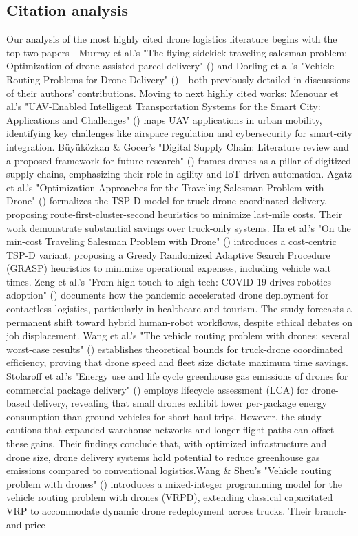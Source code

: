 \documentclass{article}
\begin{document}
\subsection{Citation analysis}
Our analysis of the most highly cited drone logistics literature begins with the top two papers—Murray et al.'s "The flying sidekick traveling salesman problem: Optimization of drone-assisted parcel delivery" (\cite{WOS:000353871700006}) and Dorling et al.'s "Vehicle Routing Problems for Drone Delivery" (\cite{WOS:000391480400007})—both previously detailed in discussions of their authors' contributions. Moving to next highly cited works: Menouar et al.'s "UAV-Enabled Intelligent Transportation Systems for the Smart City: Applications and Challenges" (\cite{WOS:000398037700003}) maps UAV applications in urban mobility, identifying key challenges like airspace regulation and cybersecurity for smart-city integration. Büyüközkan \& Gocer's "Digital Supply Chain: Literature review and a proposed framework for future research" (\cite{WOS:000432504700016}) frames drones as a pillar of digitized supply chains, emphasizing their role in agility and IoT-driven automation. Agatz et al.'s "Optimization Approaches for the Traveling Salesman Problem with Drone" (\cite{WOS:000442591800013}) formalizes the TSP-D model for truck-drone coordinated delivery, proposing route-first-cluster-second heuristics to minimize last-mile costs. Their work demonstrate substantial savings over truck-only systems. Ha et al.'s "On the min-cost Traveling Salesman Problem with Drone" (\cite{WOS:000442591800013}) introduces a cost-centric TSP-D variant, proposing a Greedy Randomized Adaptive Search Procedure (GRASP) heuristics to minimize operational expenses, including vehicle wait times. Zeng et al.'s "From high-touch to high-tech: COVID-19 drives robotics adoption" (\cite{WOS:000534121800001}) documents how the pandemic accelerated drone deployment for contactless logistics, particularly in healthcare and tourism. The study forecasts a permanent shift toward hybrid human-robot workflows, despite ethical debates on job displacement. Wang et al.'s "The vehicle routing problem with drones: several worst-case results" (\cite{WOS:000400384200003}) establishes theoretical bounds for truck-drone coordinated efficiency, proving that drone speed and fleet size dictate maximum time savings. Stolaroff et al.'s "Energy use and life cycle greenhouse gas emissions of drones for commercial package delivery" (\cite{WOS:000424872000001}) employs lifecycle assessment (LCA) for drone-based delivery, revealing that small drones exhibit lower per-package energy consumption than ground vehicles for short-haul trips. However, the study cautions that expanded warehouse networks and longer flight paths can offset these gains. Their findings conclude that, with optimized infrastructure and drone size, drone delivery systems hold potential to reduce greenhouse gas emissions compared to conventional logistics.Wang \& Sheu's "Vehicle routing problem with drones" (\cite{WOS:000465060600016}) introduces a mixed-integer programming model for the vehicle routing problem with drones (VRPD), extending classical capacitated VRP to accommodate dynamic drone redeployment across trucks. Their branch-and-price 
\end{document}
